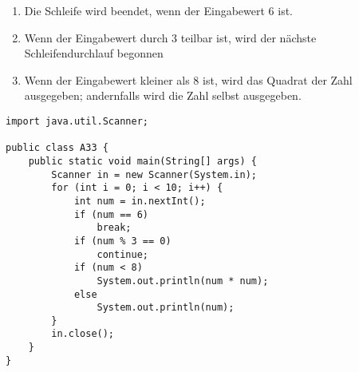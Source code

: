 \documentclass[10pt, oneside]{article}
\begin{document}
\begin{enumerate}[(1)]
\item Die Schleife wird beendet, wenn der Eingabewert 6 ist.
\item Wenn der Eingabewert durch 3 teilbar ist, wird der nächste
    Schleifendurchlauf begonnen
\item Wenn der Eingabewert kleiner als 8 ist, wird das Quadrat der Zahl
    ausgegeben; andernfalls wird die Zahl selbst ausgegeben.
\end{enumerate}

\begin{verbatim}
import java.util.Scanner;

public class A33 {
    public static void main(String[] args) {
        Scanner in = new Scanner(System.in);
        for (int i = 0; i < 10; i++) {
            int num = in.nextInt();
            if (num == 6)
                break;
            if (num % 3 == 0)
                continue;
            if (num < 8)
                System.out.println(num * num);
            else
                System.out.println(num);
        }
        in.close();
    }
}
\end{verbatim}
\end{document}

